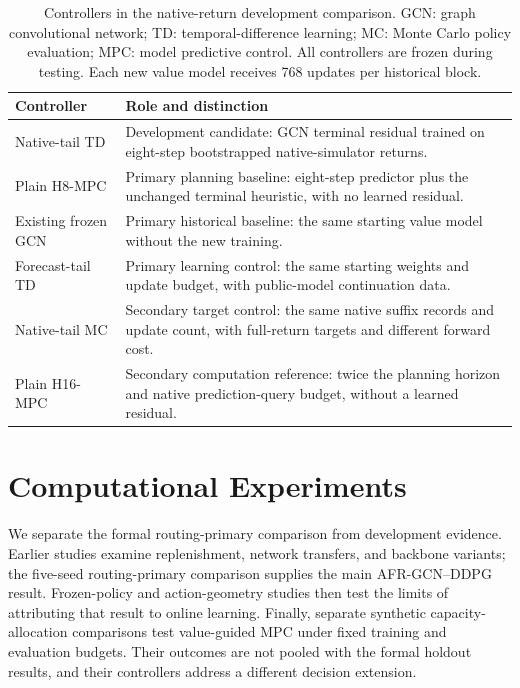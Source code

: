 \documentclass[preprint,review,12pt]{elsarticle}
\begin{document}
\begin{table}[tbp]
\centering
\caption{Controllers in the native-return development comparison. GCN: graph
convolutional network; TD: temporal-difference learning; MC: Monte Carlo
policy evaluation; MPC: model predictive control. All controllers are frozen
during testing. Each new value model receives 768 updates per historical block.}
\label{tab:native-tail-controllers}
\small
\begin{tabularx}{\textwidth}{>{\raggedright\arraybackslash}p{}X}
\toprule
Controller & Role and distinction \\
\midrule
Native-tail TD & Development candidate: GCN terminal residual trained on
eight-step bootstrapped native-simulator returns. \\
Plain H8-MPC & Primary planning baseline: eight-step predictor plus the
unchanged terminal heuristic, with no learned residual. \\
Existing frozen GCN & Primary historical baseline: the same starting value
model without the new training. \\
Forecast-tail TD & Primary learning control: the same starting weights and
update budget, with public-model continuation data. \\
Native-tail MC & Secondary target control: the same native suffix records
and update count, with full-return targets and different forward cost. \\
Plain H16-MPC & Secondary computation reference: twice the planning horizon
and native prediction-query budget, without a learned residual. \\
\bottomrule
\end{tabularx}
\end{table}

\section{Computational Experiments}
\label{sec:experiments}
\label{sec:casestudies}

We separate the formal routing-primary comparison from development evidence.
Earlier studies examine replenishment, network transfers, and backbone
variants; the five-seed routing-primary comparison supplies the main
AFR-GCN--DDPG result. Frozen-policy and action-geometry studies then test the
limits of attributing that result to online learning. Finally, separate
synthetic capacity-allocation comparisons test value-guided MPC under fixed
training and evaluation budgets. Their outcomes are not pooled with the formal
holdout results, and their controllers address a different decision extension.
\end{document}
